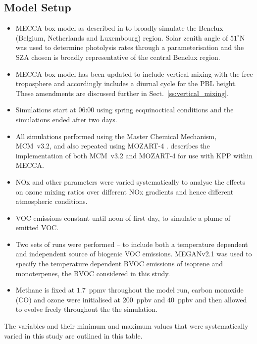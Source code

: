 \subsection{Model Setup} \label{ss:model_setup}
\begin{itemize}
    \item MECCA box model as described in \citet{Coates:2015} to broadly simulate the Benelux (Belgium, Netherlands and Luxembourg) region. Solar zenith angle of $51^{\circ}$N was used to determine photolysis rates through a parameterisation and the SZA chosen is broadly representative of the central Benelux region.
    \item MECCA box model has been updated to include vertical mixing with the free troposphere and accordingly includes a diurnal cycle for the PBL height. These amendments are discussed further in Sect.~\ref{ss:vertical_mixing}.
    \item Simulations start at 06:00 using spring ecquinoctical conditions and the simulations ended after two days.
    \item All simulations performed using the Master Chemical Mechanism, MCM~v3.2, \citep{MCM_Site} and also repeated using MOZART-4 \citep{Emmons:2010}. \citet{Coates:2015} describes the implementation of both MCM~v3.2 and MOZART-4 for use with KPP within MECCA.
    \item NOx and other parameters were varied systematically to analyse the effects on ozone mixing ratios over different NOx gradients and hence different atmospheric conditions.
    \item VOC emissions constant until noon of first day, to simulate a plume of emitted VOC.
    \item Two sets of runs were performed -- to include both a temperature dependent and independent source of biogenic VOC emissions. MEGANv2.1 \citep{Guenther:2012} was used to specify the temperature dependent BVOC emissions of isoprene and monoterpenes, the BVOC considered in this study. 
    \item Methane is fixed at $1.7$~ppmv throughout the model run, carbon monoxide (CO) and ozone were initialised at $200$~ppbv and $40$~ppbv and then allowed to evolve freely throughout the the simulation.
\end{itemize}
{%
    \renewcommand{\arraystretch}{1.1}%
    \begin{table}%
        \centering%
        \caption{The variables and their minimum and maximum values that were systematically varied in this study are outlined in this table.}%
        
    \end{table}%
}

